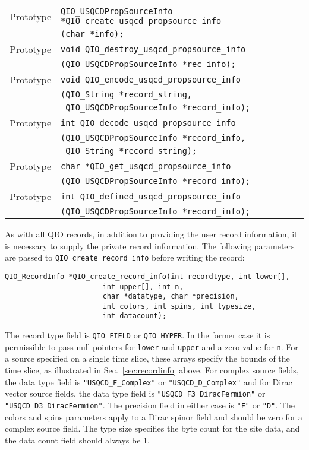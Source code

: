 \documentclass{article}
\begin{document}
\begin{flushleft}
  \begin{tabular}{|l|l|}
  \hline
  Prototype      & \verb|QIO_USQCDPropSourceInfo *QIO_create_usqcd_propsource_info|\\
                 & \verb|(char *info);|\\
  Prototype      & \verb|void QIO_destroy_usqcd_propsource_info|\\
               & \verb|(QIO_USQCDPropSourceInfo *rec_info);|\\
Prototype      & \verb|void QIO_encode_usqcd_propsource_info|\\
               & \verb|(QIO_String *record_string, |\\
               & \verb| QIO_USQCDPropSourceInfo *record_info);|\\
Prototype      & \verb|int QIO_decode_usqcd_propsource_info|\\
               & \verb|(QIO_USQCDPropSourceInfo *record_info,|\\
               & \verb| QIO_String *record_string);|\\
Prototype      & \verb|char *QIO_get_usqcd_propsource_info|\\
               & \verb|(QIO_USQCDPropSourceInfo *record_info);|\\
Prototype      & \verb|int QIO_defined_usqcd_propsource_info|\\
               & \verb|(QIO_USQCDPropSourceInfo *record_info);|\\
 \hline
 \end{tabular}
\end{flushleft}
%

As with all QIO records, in addition to providing the user record
information, it is necessary to supply the private record information.
The following parameters are passed to \verb|QIO_create_record_info|
before writing the record:
%
\begin{verbatim}
QIO_RecordInfo *QIO_create_record_info(int recordtype, int lower[],
				       int upper[], int n,
				       char *datatype, char *precision, 
				       int colors, int spins, int typesize, 
				       int datacount);
\end{verbatim}
%
The record type field is \verb|QIO_FIELD| or \verb|QIO_HYPER|. In the
former case it is permissible to pass null pointers for \verb|lower|
and \verb|upper| and a zero value for \verb|n|.  For a source
specified on a single time slice, these arrays specify the bounds of
the time slice, as illustrated in Sec.~\ref{sec:recordinfo} above.
For complex source fields, the data type field is
\verb|"USQCD_F_Complex"| or \verb|"USQCD_D_Complex"| and for Dirac
vector source fields, the data type field is
\verb|"USQCD_F3_DiracFermion"| or \verb|"USQCD_D3_DiracFermion"|.  The
precision field in either case is \verb|"F"| or \verb|"D"|.  The
colors and spins parameters apply to a Dirac spinor field and should
be zero for a complex source field.  The type size specifies the byte
count for the site data, and the data count field should always be 1.
\end{document}
